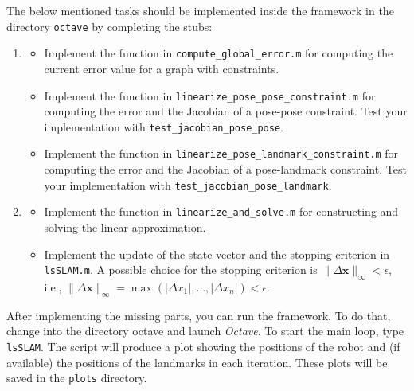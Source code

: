 \documentclass[12pt]{article}
\begin{document}
The below mentioned tasks should be implemented inside the framework in
the directory \texttt{octave} by completing the stubs:
\begin{enumerate}
  \item
    \begin{itemize}
      \item
        Implement the function in \texttt{compute\_global\_error.m} for computing the
        current error value for a graph with constraints.
      \item
        Implement the function in
        \texttt{linearize\_pose\_pose\_constraint.m} for computing the
        error and the Jacobian of a pose-pose constraint.  Test your
        implementation with \texttt{test\_jacobian\_pose\_pose}.
      \item
        Implement the function in
        \texttt{linearize\_pose\_landmark\_constraint.m} for computing
        the error and the Jacobian of a pose-landmark constraint.  Test your
        implementation with \texttt{test\_jacobian\_pose\_landmark}.
    \end{itemize}
  \item
    \begin{itemize}
      \item
        Implement the function in \texttt{linearize\_and\_solve.m} for
        constructing and solving the linear approximation.
      \item
        Implement the update of the state vector and the stopping
        criterion in \texttt{lsSLAM.m}.  A possible choice for the
        stopping criterion is $\| \Delta \mathbf{x} \|_\infty <
        \epsilon$, i.e., $\| \Delta \mathbf{x} \|_\infty = \max \left(
        |\Delta x_1|, \ldots, |\Delta x_n| \right) < \epsilon$.
    \end{itemize}
\end{enumerate}

After implementing the missing parts, you can run the framework.  To do
that, change into the directory octave and launch \emph{Octave}. To
start the main loop, type \texttt{lsSLAM}. The script will produce a
plot showing the positions of the robot and (if available) the positions
of the landmarks in each iteration.  These plots will be saved in the
\texttt{plots} directory. 
\end{document}
